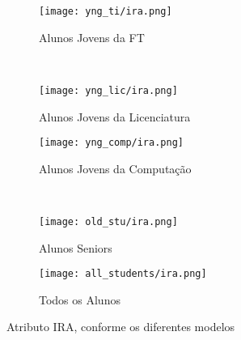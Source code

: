 \clearpage
\begin{figure}[!ht]
    \centering
    \begin{subfigure}[b]{0.48\textwidth}
        \centering
        \texttt{[image: yng\_ti/ira.png]}
        \caption{Alunos Jovens da FT}
    \end{subfigure}
    ~
    \begin{subfigure}[b]{0.48\textwidth}
        \centering
        \texttt{[image: yng\_lic/ira.png]}
        \caption{Alunos Jovens da Licenciatura}
    \end{subfigure}

    \begin{subfigure}[b]{0.48\textwidth}
        \centering
        \texttt{[image: yng\_comp/ira.png]}
        \caption{Alunos Jovens da Computação}
    \end{subfigure}
    ~
    \begin{subfigure}[b]{0.48\textwidth}
        \centering
        \texttt{[image: old\_stu/ira.png]}
        \caption{Alunos Seniors}
    \end{subfigure}

    \begin{subfigure}[b]{0.48\textwidth}
        \centering
        \texttt{[image: all\_students/ira.png]}
        \caption{Todos os Alunos}
    \end{subfigure}
    \caption{Atributo IRA, conforme os diferentes modelos}
\end{figure}

